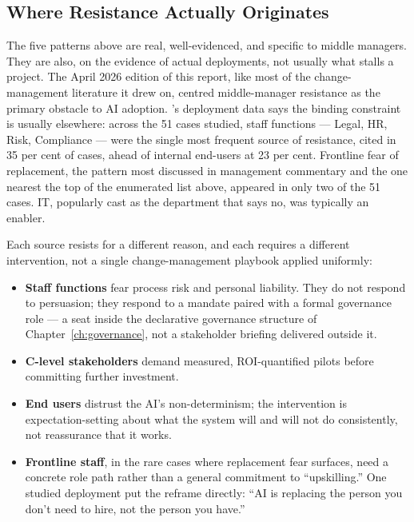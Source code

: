 \subsection{Where Resistance Actually Originates}

The five patterns above are real, well-evidenced, and specific to middle managers. They are also, on the evidence of actual deployments, not usually what stalls a project. The April 2026 edition of this report, like most of the change-management literature it drew on, centred middle-manager resistance as the primary obstacle to AI adoption. \textcite{Pereira2026Playbook}'s deployment data says the binding constraint is usually elsewhere: across the 51 cases studied, staff functions --- Legal, HR, Risk, Compliance --- were the single most frequent source of resistance, cited in 35 per cent of cases, ahead of internal end-users at 23 per cent. Frontline fear of replacement, the pattern most discussed in management commentary and the one nearest the top of the enumerated list above, appeared in only two of the 51 cases. IT, popularly cast as the department that says no, was typically an enabler.

Each source resists for a different reason, and each requires a different intervention, not a single change-management playbook applied uniformly:

\begin{itemize}
  \item \textbf{Staff functions} fear process risk and personal liability. They do not respond to persuasion; they respond to a mandate paired with a formal governance role --- a seat inside the declarative governance structure of Chapter~\ref{ch:governance}, not a stakeholder briefing delivered outside it.
  \item \textbf{C-level stakeholders} demand measured, ROI-quantified pilots before committing further investment.
  \item \textbf{End users} distrust the AI's non-determinism; the intervention is expectation-setting about what the system will and will not do consistently, not reassurance that it works.
  \item \textbf{Frontline staff}, in the rare cases where replacement fear surfaces, need a concrete role path rather than a general commitment to ``upskilling.'' One studied deployment put the reframe directly: ``AI is replacing the person you don't need to hire, not the person you have.''
\end{itemize}

